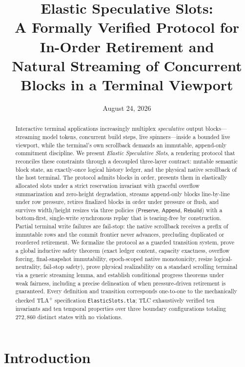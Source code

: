 \documentclass[11pt]{article}
\title{\textbf{Elastic Speculative Slots:}\\
A Formally Verified Protocol for In-Order Retirement and\\
Natural Streaming of Concurrent Blocks in a Terminal Viewport}
\author{}
\date{August 24, 2026}
\newcommand{\Preserve}{\mathsf{Preserve}}
\newcommand{\AppendPol}{\mathsf{Append}}
\newcommand{\Rebuild}{\mathsf{Rebuild}}
\theoremstyle{definition}
\theoremstyle{remark}
\begin{document}
\maketitle

\begin{abstract}
Interactive terminal applications increasingly multiplex \emph{speculative}
output blocks---streaming model tokens, concurrent build steps, live
spinners---inside a bounded live viewport, while the terminal's own scrollback
demands an immutable, append-only commitment discipline. We present
\emph{Elastic Speculative Slots}, a rendering protocol that reconciles these
constraints through a decoupled three-layer contract: mutable semantic block
state, an exactly-once logical history ledger, and the physical native
scrollback of the host terminal. The protocol admits blocks in order, presents
them in elastically allocated slots under a strict reservation invariant with
graceful overflow summarization and zero-height degradation, streams
append-only blocks line-by-line under row pressure, retires finalized blocks
in order under pressure or flush, and survives width/height resizes via three
policies ($\Preserve$, $\AppendPol$, $\Rebuild$) with a bottom-first,
single-write synchronous replay that is tearing-free by construction. Partial
terminal write failures are fail-stop: the native scrollback receives a prefix
of immutable rows and the commit frontier never advances, precluding
duplicated or reordered retirement. We formalize the protocol as a guarded
transition system, prove a global inductive safety theorem (exact ledger
content, capacity exactness, overflow forcing, final-snapshot immutability,
epoch-scoped native monotonicity, resize logical-neutrality, fail-stop
safety), prove physical realizability on a standard scrolling terminal via a
generic streaming lemma, and establish conditional progress theorems under
weak fairness, including a precise delineation of when pressure-driven
retirement is guaranteed. Every definition and transition corresponds
one-to-one to the mechanically checked TLA\textsuperscript{+} specification
\texttt{ElasticSlots.tla}; TLC exhaustively verified ten invariants and ten
temporal properties over three boundary configurations totaling
$272{,}860$ distinct states with no violations.
\end{abstract}

\tableofcontents

\section{Introduction}\label{sec:intro}
\end{document}

